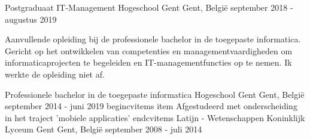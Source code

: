 


\begin{cventries}

\cventry
{Postgraduaat IT-Management} %
{Hogeschool Gent} %
{Gent, België} %
{september 2018 - augustus 2019} %
{ %
\begin{cvitems}
\item {Aanvullende opleiding bij de professionele bachelor in de toegepaste informatica. Gericht op het ontwikkelen van competenties en managementvaardigheden om informaticaprojecten te begeleiden en
IT-managementfuncties op te nemen. Ik werkte de opleiding niet af.
}
\end{cvitems}
}

\cventry
{Professionele bachelor in de toegepaste informatica} %
{Hogeschool Gent} %
{Gent, België} %
{september 2014 - juni 2019} %
{ %
begin{cvitems}
item {Afgestudeerd met onderscheiding in het traject 'mobiele applicaties'}
end{cvitems}
}
\cventry
{Latijn - Wetenschappen} %
{Koninklijk Lyceum Gent} %
{Gent, België} %
{september 2008 - juli 2014} %
{ %
}


\end{cventries}